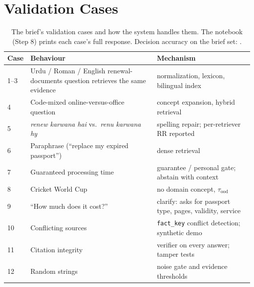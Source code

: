 \documentclass[12pt,a4paper]{article}
\begin{document}
\section{Validation Cases}
\begin{table}[H]
\centering
\small
\begin{tabularx}{\textwidth}{@{}l X X@{}}
\toprule
Case & Behaviour & Mechanism \\
\midrule
1--3 & Urdu / Roman / English renewal-documents question retrieves the same evidence & normalization, lexicon, bilingual index \\
4 & Code-mixed online-versus-office question & concept expansion, hybrid retrieval \\
5 & \textit{renew karwana hai} vs.\ \textit{renu karwana hy} & spelling repair; per-retriever RR reported \\
6 & Paraphrase (``replace my expired passport'') & dense retrieval \\
7 & Guaranteed processing time & guarantee / personal gate; abstain with context \\
8 & Cricket World Cup & no domain concept, $\tau_{\text{ood}}$ \\
9 & ``How much does it cost?'' & clarify: asks for passport type, pages, validity, service \\
10 & Conflicting sources & \texttt{fact\_key} conflict detection; synthetic demo \\
11 & Citation integrity & verifier on every answer; tamper tests \\
12 & Random strings & noise gate and evidence thresholds \\
\bottomrule
\end{tabularx}
\caption{The brief's validation cases and how the system handles them. The notebook (Step 8) prints each case's full
response. Decision accuracy on the brief set: \RBriefAcc.}
\label{tab:cases}
\end{table}

\end{document}
